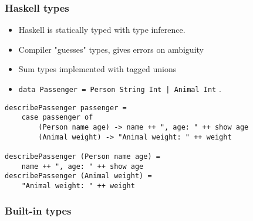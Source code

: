 \documentclass{beamer}
\begin{document}
\begin{frame}[fragile]
\frametitle{Haskell types}

\begin{itemize}
\item Haskell is statically typed with type inference.
\item Compiler "guesses" types, gives errors on ambiguity
\item Sum types implemented with tagged unions
\item \verb+data Passenger = Person String Int | Animal Int+ .
\end{itemize}

\begin{verbatim}
describePassenger passenger =
    case passenger of
        (Person name age) -> name ++ ", age: " ++ show age
        (Animal weight) -> "Animal weight: " ++ weight

describePassenger (Person name age) =
    name ++ ", age: " ++ show age
describePassenger (Animal weight) =
    "Animal weight: " ++ weight
\end{verbatim}
\end{frame}

\begin{frame}[fragile]
\frametitle{Built-in types}

\end{frame}
\end{document}
